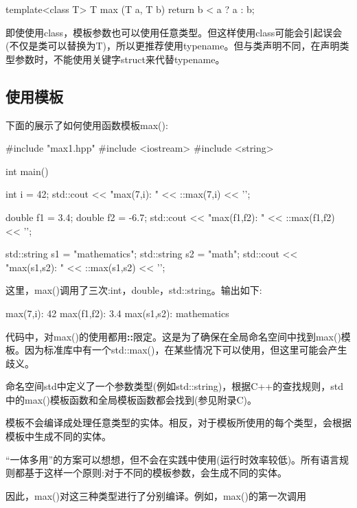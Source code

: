 \begin{cpp}
template<class T>
T max (T a, T b)
{
	return b < a ? a : b;
}
\end{cpp}

即使使用class，模板参数也可以使用任意类型。但这样使用class可能会引起误会(不仅是类可以替换为T)，所以更推荐使用typename。但与类声明不同，在声明类型参数时，不能使用关键字struct来代替typename。

\subsection{使用模板}

下面的展示了如何使用函数模板max():

\begin{cpp}
#include "max1.hpp"
#include <iostream>
#include <string>

int main()
{
	int i = 42;
	std::cout << "max(7,i): " << ::max(7,i) << '\n';
	
	double f1 = 3.4;
	double f2 = -6.7;
	std::cout << "max(f1,f2): " << ::max(f1,f2) << '\n';
	
	std::string s1 = "mathematics";
	std::string s2 = "math";
	std::cout << "max(s1,s2): " << ::max(s1,s2) << '\n';
}
\end{cpp}

这里，max()调用了三次:int，double，std::string。输出如下:

\begin{shell}
max(7,i): 42
max(f1,f2): 3.4
max(s1,s2): mathematics
\end{shell}

代码中，对max()的使用都用\textbf{::}限定。这是为了确保在全局命名空间中找到max()模板。因为标准库中有一个std::max()，在某些情况下可以使用，但这里可能会产生歧义。

\begin{notice}命名空间std中定义了一个参数类型(例如std::string)，根据C++的查找规则，std中的max()模板函数和全局模板函数都会找到(参见附录C)。
\end{notice}

模板不会编译成处理任意类型的实体。相反，对于模板所使用的每个类型，会根据模板中生成不同的实体。

\begin{notice}“一体多用”的方案可以想想，但不会在实践中使用(运行时效率较低)。所有语言规则都基于这样一个原则:对于不同的模板参数，会生成不同的实体。
\end{notice}

因此，max()对这三种类型进行了分别编译。例如，max()的第一次调用

